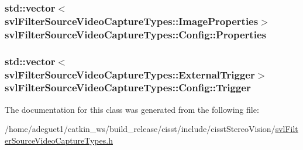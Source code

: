 \hypertarget{classsvl_filter_source_video_capture_types_1_1_config_ab5daa0ef70017629bd9936bddd000a42}{
\subsubsection[{Properties}]{\setlength{\rightskip}{0pt plus 5cm}std\-::vector$<${\bf svl\-Filter\-Source\-Video\-Capture\-Types\-::\-Image\-Properties}$>$ svl\-Filter\-Source\-Video\-Capture\-Types\-::\-Config\-::\-Properties}}\label{classsvl_filter_source_video_capture_types_1_1_config_ab5daa0ef70017629bd9936bddd000a42}
\hypertarget{classsvl_filter_source_video_capture_types_1_1_config_a175a2e1c99c02c116b0d8dedf2d28cd9}{
\subsubsection[{Trigger}]{\setlength{\rightskip}{0pt plus 5cm}std\-::vector$<${\bf svl\-Filter\-Source\-Video\-Capture\-Types\-::\-External\-Trigger}$>$ svl\-Filter\-Source\-Video\-Capture\-Types\-::\-Config\-::\-Trigger}}\label{classsvl_filter_source_video_capture_types_1_1_config_a175a2e1c99c02c116b0d8dedf2d28cd9}


The documentation for this class was generated from the following file\-:\begin{DoxyCompactItemize}
\item 
/home/adeguet1/catkin\-\_\-ws/build\-\_\-release/cisst/include/cisst\-Stereo\-Vision/\hyperlink{svl_filter_source_video_capture_types_8h}{svl\-Filter\-Source\-Video\-Capture\-Types.\-h}\end{DoxyCompactItemize}
